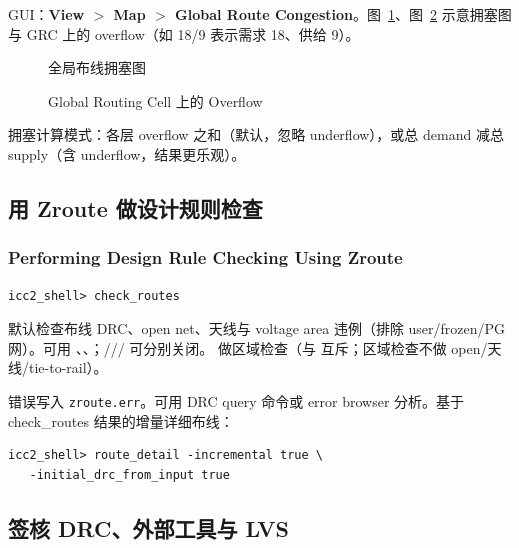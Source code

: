 GUI：\textbf{View $>$ Map $>$ Global Route Congestion}。图~\ref{fig:cong-map}、图~\ref{fig:cong-grc} 示意拥塞图与 GRC 上的 overflow（如 18/9 表示需求 18、供给 9）。

\begin{figure}[htbp]
\centering
{}
\caption{全局布线拥塞图}
\label{fig:cong-map}
\end{figure}

\begin{figure}[htbp]
\centering
{}
\caption{Global Routing Cell 上的 Overflow}
\label{fig:cong-grc}
\end{figure}

拥塞计算模式：各层 overflow 之和（默认，忽略 underflow），或总 demand 减总 supply（含 underflow，结果更乐观）。

\subsection{用 Zroute 做设计规则检查}
\subsubsection*{Performing Design Rule Checking Using Zroute}

\begin{lstlisting}
icc2_shell> check_routes
\end{lstlisting}

默认检查布线 DRC、open net、天线与 voltage area 违例（排除 user/frozen/PG 网）。可用 、、；/// 可分别关闭。 做区域检查（与  互斥；区域检查不做 open/天线/tie-to-rail）。

错误写入 \texttt{zroute.err}。可用 DRC query 命令或 error browser 分析。基于 check\_routes 结果的增量详细布线：
\begin{lstlisting}
icc2_shell> route_detail -incremental true \
   -initial_drc_from_input true
\end{lstlisting}

\subsection{签核 DRC、外部工具与 LVS}
